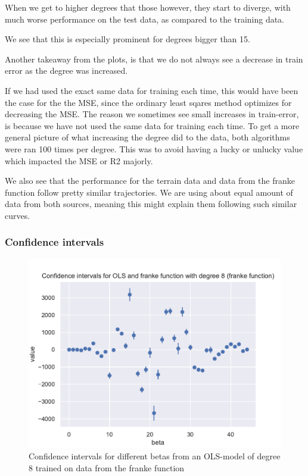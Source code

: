 \documentclass[12pt]{article}
\begin{document}
When we get to higher degrees that those however, they start to diverge, with much worse performance on the test data, as compared to the training data.

We see that this is especially prominent for degrees bigger than 15.

Another takeaway from the plots, is that we do not always see a decrease in train error as the degree was increased.

If we had used the exact same data for training each time, this would have been the case for the the MSE, since the ordinary least sqares method optimizes for decreasing the MSE.
The reason we sometimes see small increases in train-error, is because we have not used the same data for training each time. To get a more general picture of what increasing the degree did to the data, both algorithms were ran 100 times per degree. This was to avoid having a lucky or unlucky value which impacted the MSE or R2 majorly.

We also see that the performance for the terrain data and data from the franke function follow pretty similar trajectories.
We are using about equal amount of data from both sources, meaning this might explain them following such similar curves.



\subsubsection{Confidence intervals}

\begin{figure}[H]
    \centering
    \includegraphics[width=0.8\columnwidth]{../src/output/ols_confidence_intervals_franke_function.pdf}
    \caption{Confidence intervals for different betas from an OLS-model of degree 8 trained on data from the franke function}
    \label{fig:ols_confidence_intervals_franke}
\end{figure}
\end{document}
